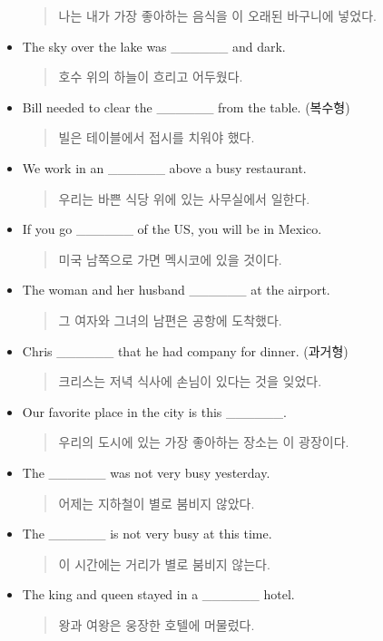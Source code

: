 \documentclass{article}
\begin{document}
\begin{addmargin}[1em]{1em}
\begin{itemize}
    \begin{quote}
    나는 내가 가장 좋아하는 음식을 이 오래된 바구니에 넣었다.
    \end{quote}
    \item The sky over the lake was \_\_\_\_\_\_ and dark.
    \begin{quote}
    호수 위의 하늘이 흐리고 어두웠다.
    \end{quote}
    \item Bill needed to clear the \_\_\_\_\_\_ from the table. (복수형)
    \begin{quote}
    빌은 테이블에서 접시를 치워야 했다.
    \end{quote}
    \item We work in an \_\_\_\_\_\_ above a busy restaurant.
    \begin{quote}
    우리는 바쁜 식당 위에 있는 사무실에서 일한다.
    \end{quote}
    \item If you go \_\_\_\_\_\_ of the US, you will be in Mexico.
    \begin{quote}
    미국 남쪽으로 가면 멕시코에 있을 것이다.
    \end{quote}
    \item The woman and her husband \_\_\_\_\_\_ at the airport.
    \begin{quote}
    그 여자와 그녀의 남편은 공항에 도착했다.
    \end{quote}
    \item Chris \_\_\_\_\_\_ that he had company for dinner. (과거형)
    \begin{quote}
    크리스는 저녁 식사에 손님이 있다는 것을 잊었다.
    \end{quote}
    \item Our favorite place in the city is this \_\_\_\_\_\_.
    \begin{quote}
    우리의 도시에 있는 가장 좋아하는 장소는 이 광장이다.
    \end{quote}
    \item The \_\_\_\_\_\_ was not very busy yesterday.
    \begin{quote}
    어제는 지하철이 별로 붐비지 않았다.
    \end{quote}
    \item The \_\_\_\_\_\_ is not very busy at this time.
    \begin{quote}
    이 시간에는 거리가 별로 붐비지 않는다.
    \end{quote}
    \item The king and queen stayed in a \_\_\_\_\_\_ hotel.
    \begin{quote}
    왕과 여왕은 웅장한 호텔에 머물렀다.
    \end{quote}

\end{itemize}
\end{addmargin}
\end{document}
